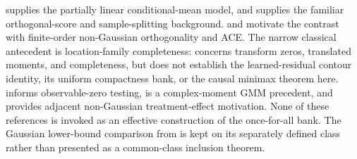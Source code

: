 \cite{Robinson1988} supplies the partially linear conditional-mean model, and \cite{ChernozhukovEtAl2018DML} supplies the familiar orthogonal-score and sample-splitting background.  \cite{MackeySyrgkanisZadik2018} and \cite[Theorem 5.4]{JinMackeySyrgkanis2025} motivate the contrast with finite-order non-Gaussian orthogonality and ACE.  The narrow classical antecedent is location-family completeness: \cite{Mattner1992} concerns transform zeros, translated moments, and completeness, but does not establish the learned-residual contour identity, its uniform compactness bank, or the causal minimax theorem here.  \cite{HuShiu2022} informs observable-zero testing, \cite{ChackoViceira2003} is a complex-moment GMM precedent, and \cite{ReizingerEtAl2025} provides adjacent non-Gaussian treatment-effect motivation.  None of these references is invoked as an effective construction of the once-for-all bank.  The Gaussian lower-bound comparison from \cite[Theorem 3.2]{JinMackeySyrgkanis2025} is kept on its separately defined class rather than presented as a common-class inclusion theorem.
